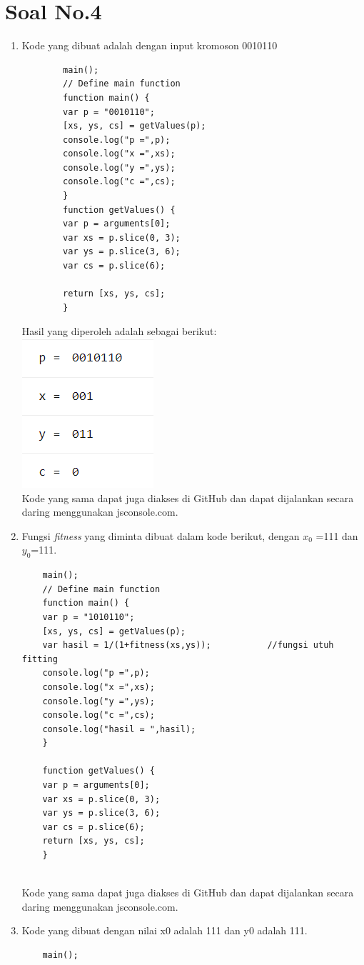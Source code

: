 \documentclass[12pt]{article}
\begin{document}
\section{Soal No.4}
\begin{enumerate}[label=(\alph*)]
	\item 
	Kode yang dibuat adalah dengan input kromoson 0010110
	\begin{verbatim}
		main();
		// Define main function
		function main() {
		var p = "0010110";
		[xs, ys, cs] = getValues(p);
		console.log("p =",p);
		console.log("x =",xs);
		console.log("y =",ys);
		console.log("c =",cs);
		}
		function getValues() {
		var p = arguments[0];
		var xs = p.slice(0, 3);
		var ys = p.slice(3, 6);
		var cs = p.slice(6);
		
		return [xs, ys, cs];
		}
	\end{verbatim}
	Hasil yang diperoleh adalah sebagai berikut:\\
	\includegraphics[scale=1]{UASFiskom0401.png}\\
	Kode yang sama dapat juga diakses di GitHub dan dapat dijalankan secara daring menggunakan jsconsole.com.
	\item
	Fungsi \textit{fitness} yang diminta dibuat dalam kode berikut, dengan $x_0$ =111 dan $y_0$=111.
	\begin{verbatim}
	main();
	// Define main function
	function main() {
	var p = "1010110";
	[xs, ys, cs] = getValues(p);
	var hasil = 1/(1+fitness(xs,ys));			//fungsi utuh fitting
	console.log("p =",p);
	console.log("x =",xs);
	console.log("y =",ys);
	console.log("c =",cs);
	console.log("hasil = ",hasil);
	}
	
	function getValues() {
	var p = arguments[0];
	var xs = p.slice(0, 3);
	var ys = p.slice(3, 6);
	var cs = p.slice(6);
	return [xs, ys, cs];
	}
	
	\end{verbatim}

	Kode yang sama dapat juga diakses di GitHub dan dapat dijalankan secara daring menggunakan jsconsole.com.
  \item 
  Kode yang dibuat dengan nilai x0 adalah 111 dan y0 adalah 111.
  	\begin{verbatim}
  	main();
  	

\end{verbatim}
\end{enumerate}
\end{document}
